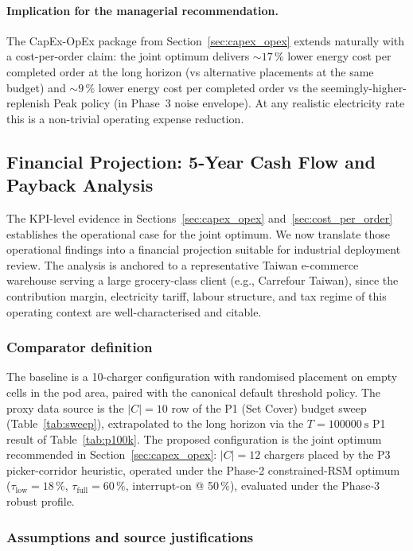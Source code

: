 \documentclass[conference]{IEEEtran}
\begin{document}
\paragraph{Implication for the managerial recommendation.}
The CapEx-OpEx package from Section~\ref{sec:capex_opex} extends naturally with a cost-per-order claim: the joint optimum delivers $\sim 17$\,\% lower energy cost per completed order at the long horizon (vs alternative placements at the same budget) and $\sim 9$\,\% lower energy cost per completed order vs the seemingly-higher-replenish Peak policy (in Phase~3 noise envelope). At any realistic electricity rate this is a non-trivial operating expense reduction.

\subsection{Financial Projection: 5-Year Cash Flow and Payback Analysis}
\label{sec:financial_projection}

The KPI-level evidence in Sections~\ref{sec:capex_opex} and~\ref{sec:cost_per_order} establishes the operational case for the joint optimum. We now translate those operational findings into a financial projection suitable for industrial deployment review. The analysis is anchored to a representative Taiwan e-commerce warehouse serving a large grocery-class client (e.g., Carrefour Taiwan), since the contribution margin, electricity tariff, labour structure, and tax regime of this operating context are well-characterised and citable.

\subsubsection{Comparator definition}

The baseline is a 10-charger configuration with randomised placement on empty cells in the pod area, paired with the canonical default threshold policy. The proxy data source is the $|C|=10$ row of the P1 (Set Cover) budget sweep (Table~\ref{tab:sweep}), extrapolated to the long horizon via the $T = \SI{100000}{\second}$ P1 result of Table~\ref{tab:p100k}. The proposed configuration is the joint optimum recommended in Section~\ref{sec:capex_opex}: $|C|=12$ chargers placed by the P3 picker-corridor heuristic, operated under the Phase-2 constrained-RSM optimum ($\tau_\text{low}=18\,\%$, $\tau_\text{full}=60\,\%$, interrupt-on @ 50\,\%), evaluated under the Phase-3 robust profile.

\subsubsection{Assumptions and source justifications}
\end{document}

